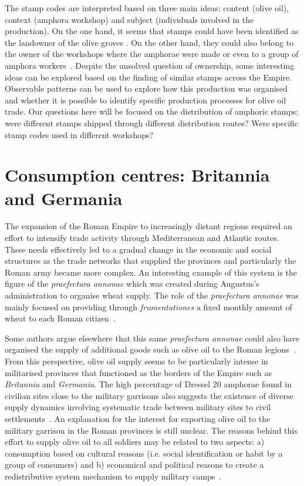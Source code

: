 The stamp codes are interpreted based on three main ideas: content (olive oil), context (amphora workshop) and subject (individuals involved in the production). On the one hand, it seems that stamps could have been identified as the landowner of the olive groves \citep{rodriguez_economioleicola_1977}. On the other hand, they could also belong to the owner of the workshops where the amphorae were made or even to a group of amphora workers~\citep{berni_millet_epigrafianforica_2008}. Despite the unsolved question of ownership, some interesting ideas can be explored based on the finding of similar stamps across the Empire. Observable patterns can be used to explore how this production was organised and whether it is possible to identify specific production processes for olive oil trade. Our questions here will be focused on the distribution of amphoric stamps; were different stamps shipped through different distribution routes? Were specific stamp codes used in different workshops?

\section{Consumption centres: Britannia and Germania}
\label{sec:3}

The expansion of the Roman Empire to increasingly distant regions required an effort to intensify trade activity through Mediterranean and Atlantic routes. These needs effectively led to a gradual change in the economic and social structures as the trade networks that supplied the provinces and particularly the Roman army became more complex. An interesting example of this system is the figure of the \textit{praefectura annonae} which was created during Augustus's administration to organise wheat supply. The role of the \textit{praefectura annonae} was mainly focused on providing through \textit{frumentationes} a fixed monthly amount of wheat to each Roman citizen~\citep{remesal_annona_1986,remesal_concierto}.

Some authors argue elsewhere that this same \textit{praefectura annonae} could also have organised the supply of additional goods such as olive oil to the Roman legions~\citep{remesal_annona_1986,remesal_annona_1990}. From this perspective, olive oil supply seems to be particularly intense in militarised provinces that functioned as the borders of the Empire such as \textit{Britannia} and \textit{Germania}. The high percentage of Dressel 20 amphorae found in civilian sites close to the military garrisons also suggests the existence of diverse supply dynamics involving systematic trade between military sites to civil settlements~\citep{remesal_annona_1986, carreras_britannia_1998}. An explanation for the interest for exporting olive oil to the military garrison in the Roman provinces is still unclear. The reasons behind this effort to supply olive oil to all soldiers may be related to two aspects: a) consumption based on cultural reasons (i.e. social identification or habit by a group of consumers) and b) economical and political reasons to create a redistributive system mechanism to supply military camps~\citep[69-70]{carreras_britannia_1998}. 

